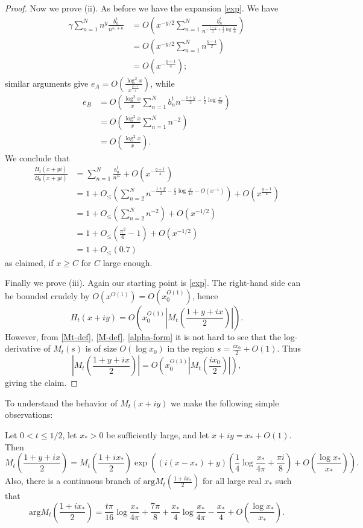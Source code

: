 \begin{proof}
Now we prove (ii).  As before we have the expansion \eqref{exp}.  We have
\begin{align*}
\gamma \sum_{n=1}^N n^y \frac{b_n^t}{n^{\overline{s_*} + \kappa}} &= O\left( x^{-y/2} \sum_{n=1}^N \frac{b_n^t}{n^{-\frac{1-y}{2} + \frac{t}{2} \log \frac{x}{4\pi}}} \right) \\
&= O\left( x^{-y/2} \sum_{n=1}^N n^{\frac{y-1}{2}} \right) \\
&= O(x^{-\frac{y-1}{4}});
\end{align*}
similar arguments give $e_A = O( \frac{\log^2 x}{x^{\frac{y-1}{4}}} )$, while
\begin{align*}
e_B &= O\left( \frac{\log^2 x}{x} \sum_{n=1}^N b_n^t n^{-\frac{1+y}{2}-\frac{t}{2} \log \frac{x}{4\pi}} \right) \\
&= O\left( \frac{\log^2 x}{x} \sum_{n=1}^N n^{-2} \right) \\
&= O\left( \frac{\log^2 x}{x} \right).
\end{align*}
We conclude that
\begin{align*}
\frac{H_t(x+yi)}{B_0(x+yi)} &= \sum_{n=1}^N \frac{b_n^t}{n^{s_*}} + O( x^{-\frac{y-1}{4}} ) \\
&= 1 + O_{\leq}\left( \sum_{n=2}^N n^{-\frac{1+y}{2} - \frac{t}{2} \log \frac{x}{4\pi} - O(x^{-1})} \right) + O( x^{\frac{y-1}{4}} ) \\
&= 1 + O_{\leq}\left( \sum_{n=2}^N n^{-2} \right) + O( x^{-1/2}) \\
&= 1 + O_{\leq}\left( \frac{\pi^2}{6} - 1 \right) + O( x^{-1/2} ) \\
&= 1 + O_{\leq}( 0.7 )
\end{align*}
as claimed, if $x \geq C$ for $C$ large enough.

Finally we prove (iii).  Again our starting point is \eqref{exp}.  The right-hand side can be bounded crudely by $O( x^{O(1)}) = O(x_0^{O(1)})$, hence
$$ H_t(x+iy) = O( x_0^{O(1)} |M_t( \frac{1+y+ix}{2} )| ).$$
However, from \eqref{Mt-def}, \eqref{M-def}, \eqref{alpha-form} it is not hard to see that the log-derivative of $M_t(s)$ is of size $O( \log x_0 )$ in the region $s = \frac{ix_0}{2} + O(1)$.  Thus
$$ |M_t( \frac{1+y+ix}{2} )| = O( x_0^{O(1)} |M_t( \frac{ix_0}{2} )| ),$$
giving the claim.
\end{proof}

To understand the behavior of $M_t(x+iy)$ we make the following simple observations:

\begin{lemma}\label{mtform}  Let $0 < t \leq 1/2$, let $x_* > 0$ be sufficiently large, and let $x+iy = x_* + O(1)$.  Then
$$ M_t(\frac{1+y+ix}{2}) = M_t(\frac{1+ix_*}{2}) \exp\left( (i(x-x_*)+y) \left(\frac{1}{4} \log \frac{x_*}{4\pi} + \frac{\pi i}{8}\right) + O\left( \frac{\log x_*}{x_*}\right) \right).$$
Also, there is a continuous branch of $\mathrm{arg} M_t\left(\frac{1+ix_*}{2}\right)$ for all large real $x_*$ such that
$$ \mathrm{arg} M_t\left(\frac{1+ix_*}{2}\right) = \frac{t \pi}{16} \log \frac{x_*}{4\pi} + \frac{7\pi}{8} 
+ \frac{x_*}{4} \log \frac{x_*}{4\pi} - \frac{x_*}{4} + O( \frac{\log x_*}{x_*} ).$$
\end{lemma}

